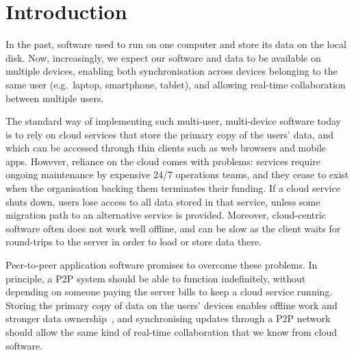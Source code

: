 \documentclass[sigplan,10pt]{acmart}
\begin{document}


\maketitle

\section{Introduction}

In the past, software used to run on one computer and store its data on the local disk.
Now, increasingly, we expect our software and data to be available on multiple devices, enabling both synchronisation across devices belonging to the same user (e.g.\ laptop, smartphone, tablet), and allowing real-time collaboration between multiple users.

The standard way of implementing such multi-user, multi-device software today is to rely on cloud services that store the primary copy of the users' data, and which can be accessed through thin clients such as web browsers and mobile apps.
However, reliance on the cloud comes with problems: services require ongoing maintenance by expensive 24/7 operations teams, and they cease to exist when the organisation backing them terminates their funding.
If a cloud service shuts down, users lose access to all data stored in that service, unless some migration path to an alternative service is provided.
Moreover, cloud-centric software often does not work well offline, and can be slow as the client waits for round-trips to the server in order to load or store data there.

Peer-to-peer application software promises to overcome these problems.
In principle, a P2P system should be able to function indefinitely, without depending on someone paying the server bills to keep a cloud service running.
Storing the primary copy of data on the users' devices enables offline work and stronger data ownership~\cite{LocalFirst}, and synchronising updates through a P2P network should allow the same kind of real-time collaboration that we know from cloud software.
\end{document}
